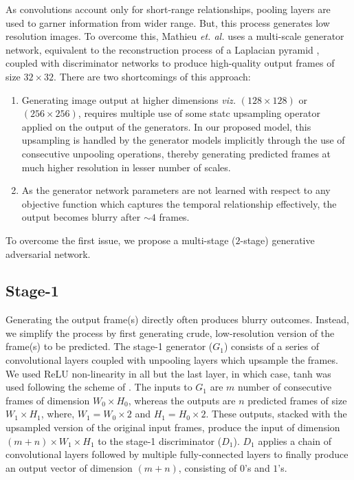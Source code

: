 \documentclass{article}
\begin{document}
  As convolutions account only for short-range relationships, pooling layers are used to garner information from wider range. But, this process generates low resolution images. To overcome this, Mathieu \textit{et. al.} \cite{mathieu2015deep} uses a multi-scale generator network, equivalent to the reconstruction process of a Laplacian pyramid \cite{DBLP:journals/corr/RadfordMC15}, coupled with discriminator networks to produce high-quality output frames of size $ 32 \times 32 $.
  There are two shortcomings of this approach:
  \renewcommand{\theenumi}{\alph{enumi}} 
  \begin{enumerate}
  	\item Generating image output at higher dimensions \textit{viz.} $ (128 \times 128) $ or $(256 \times 256) $, requires multiple use of some statc upsampling operator applied on the output of the generators. In our proposed model, this upsampling is handled by the generator models implicitly through the use of consecutive unpooling operations, thereby generating predicted frames at much higher resolution in lesser number of scales.
  	
  	\item  As the generator network parameters are not learned with respect to any objective function which captures the temporal relationship effectively, the output becomes blurry after $ \sim 4 $ frames.
  \end{enumerate}
  
  To overcome the first issue, we propose a multi-stage ($ 2 $-stage) generative adversarial network.
  
  \subsection{Stage-1}
	  Generating the output frame(s) directly often produces blurry outcomes. Instead, we simplify the process by first generating crude, low-resolution version of the frame(s) to be predicted. The stage-1 generator ($ G_1 $) consists of a series of convolutional layers coupled with unpooling layers \cite{zeiler2014visualizing} which upsample the frames. We used ReLU non-linearity in all but the last layer, in which case, tanh was used following the scheme of \cite{DBLP:journals/corr/RadfordMC15}. The inputs to $ G_1 $ are $ m $ number of consecutive frames of dimension $ W_0 \times H_0 $, whereas the outputs are $ n $ predicted frames of size $ W_1 \times H_1$, where, $ W_1 = W_0 \times 2 $ and $ H_1 = H_0 \times 2 $. These outputs, stacked with the upsampled version of the original input frames, produce the input of dimension $ (m + n) \times W_1 \times H_1 $ to the stage-1 discriminator ($ D_1 $). $ D_1 $ applies a chain of convolutional layers followed by multiple fully-connected layers to finally produce an output vector of dimension $ (m + n) $, consisting of $ 0 $'s and $ 1 $'s. 
	  
\end{document}
